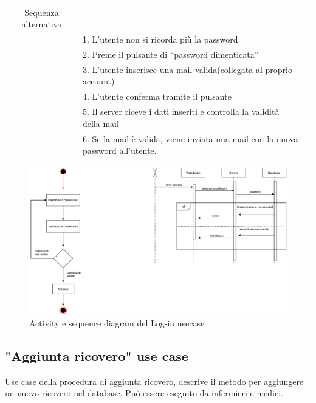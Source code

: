 \documentclass{article}
\begin{document}
\begin{center}
\begin{tabular}{r@{\vspace{0.4cm}}ll}
\multicolumn{1}{c}{Sequenza alternativa}  \\     \cline{1-1}&

1. L’utente non si ricorda più la password \\&
     2. Preme il pulsante di “password dimenticata”\\&
        3. L’utente inserisce una mail valida(collegata al proprio account)  \\&
	    4. L’utente conferma tramite il pulsante  \\&
        5. Il server riceve i dati inseriti e controlla la validità della mail \\&
    6. Se la mail è valida, viene inviata una mail con la nuova password all’utente.\\

\hline

	\end{tabular}

\end{center}


\begin{figure}[H]

		\includegraphics[width=1.1\textwidth]{documenti/Activity_Sequence_diagram_Login.pdf}
		\caption{Activity e sequence diagram del Log-in usecase}
		\label{ActivitySequencediagramLogin}

\end{figure}


\vspace{2cm}




\subsection{"Aggiunta ricovero" use case}

Use case della procedura di aggiunta ricovero, descrive il metodo per aggiungere un nuovo ricovero nel database. Può essere eseguito da infermieri e medici.
\end{document}
